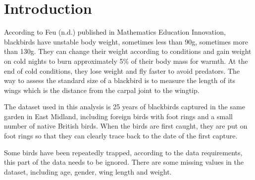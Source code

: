 \section{Introduction}
According to Feu (n.d.) published in Mathematics Education Innovation, blackbirds have unstable body weight, sometimes less than 90g, sometimes more than 130g. They can change their weight according to conditions and gain weight on cold nights to burn approximately 5\% of their body mass for warmth. At the end of cold conditions, they lose weight and fly faster to avoid predators. The way to assess the standard size of a blackbird is to measure the length of its wings which is the distance from the carpal joint to the wingtip.

The dataset used in this analysis is 25 years of blackbirds captured in the same garden in East Midland, including foreign birds with foot rings and a small number of native British birds. When the birds are first caught, they are put on foot rings so that they can clearly trace back to the date of the first capture.

Some birds have been repeatedly trapped, according to the data requirements, this part of the data needs to be ignored. There are some missing values in the dataset, including age, gender, wing length and weight.
